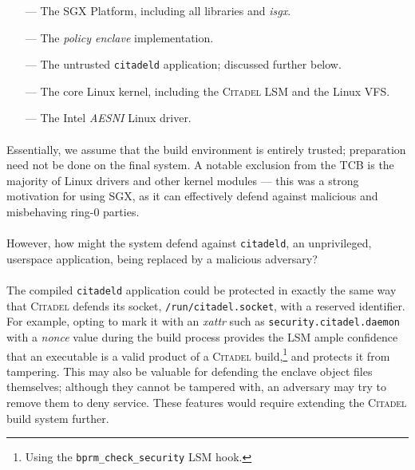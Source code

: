 \begin{itemize}
    \item[---] The SGX Platform, including all libraries and \textit{isgx}. 
    \item[---] The \textit{policy enclave} implementation.
    \item[---] The untrusted \texttt{citadeld} application; discussed further below.
    \item[---] The core Linux kernel, including the \textsc{Citadel} LSM and the Linux VFS.   
    \item[---] The Intel \textit{AESNI} Linux driver. 
\end{itemize}

\paragraph{} Essentially, we assume that the build environment is entirely trusted; preparation need not be done on the final system. A notable exclusion from the TCB is the majority of Linux drivers and other kernel modules --- this was a strong motivation for using SGX, as it can effectively defend against malicious and misbehaving ring-0 parties. 

\paragraph{} However, how might the system defend against \texttt{citadeld}, an unprivileged, userspace application, being replaced by a malicious adversary?


\paragraph{} The compiled \texttt{citadeld} application could be protected in exactly the same way that \textsc{Citadel} defends its socket, \texttt{/run/citadel.socket}, with a reserved identifier. For example, opting to mark it with an \textit{xattr} such as \texttt{security.citadel.daemon} with a \textit{nonce} value during the build process provides the LSM ample confidence that an executable is a valid product of a \textsc{Citadel} build,\footnote{Using the \texttt{bprm\_check\_security} LSM hook.} and protects it from tampering. This may also be valuable for defending the enclave object files themselves; although they cannot be tampered with, an adversary may try to remove them to deny service. These features would require extending the \textsc{Citadel} build system further.

